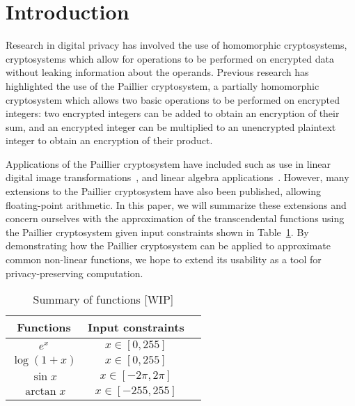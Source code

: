 \section{Introduction}
Research in digital privacy has involved the use of homomorphic cryptosystems, cryptosystems which allow for operations to be performed on encrypted data without leaking information about the operands.
Previous research has highlighted the use of the Paillier cryptosystem, a partially homomorphic cryptosystem which allows two basic operations to be performed on encrypted integers: two encrypted integers can be added to obtain an encryption of their sum, and an encrypted integer can be multiplied to an unencrypted plaintext integer to obtain an encryption of their product.

Applications of the Paillier cryptosystem have included such as use in linear digital image transformations~\cite{ziad_cryptoimg:_2016}, and linear algebra applications~\cite{hutchison_privacy-preserving_2009}. However, many extensions to the Paillier cryptosystem have also been published, allowing floating-point arithmetic. In this paper, we will summarize these extensions and concern ourselves with the approximation of the transcendental functions using the Paillier cryptosystem given input constraints shown in Table~\ref{tab:inputconstraints}. By demonstrating how the Paillier cryptosystem can be applied to approximate common non-linear functions, we hope to extend its usability as a tool for privacy-preserving computation.
\begin{table}
	\caption{Summary of functions [WIP]}
	\label{tab:inputconstraints}
	\begin{tabular}{ccl}
		\toprule
		Functions & Input constraints\\
		\midrule
		$e^x$ & $x\in[0,255]$\\
		$\log(1+x)$ & $x\in[0,255]$\\
		$\sin x$ & $x\in[-2\pi,2\pi]$ \\
		$\arctan x$ & $x\in[-255,255]$\\
		\bottomrule
\end{tabular}
\end{table}
